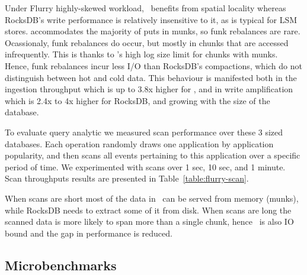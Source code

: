 Under Flurry highly-skewed workload, \sys\ benefits from spatial locality whereas RocksDB's write performance 
is relatively insensitive to it, as is typical for LSM stores. \sys\/ accommodates the majority of
puts in munks, so funk rebalances are rare. Ocassionaly, funk rebalances do occur, but mostly in 
chunks that are accessed infrequently. This is thanks to \sys\/'s high log size limit for chunks 
with munks. Hence, funk rebalances incur less I/O than RocksDB's compactions, 
which do not distinguish between hot and cold data. This behaviour is manifested both in the ingestion throughput which is up to 3.8x higher for \sys, and in write amplification which is 2.4x to 4x higher for RocksDB, and growing with the size of the database.


To evaluate query analytic we measured scan performance over these 3 sized databases. Each operation randomly draws one application by application popularity, and then scans all events pertaining to this application over a specific period of time. 
We experimented with scans over 1 sec, 10 sec, and 1 minute.
Scan throughputs results are presented in Table~\ref{table:flurry-scan}.

\begin{table}[htb]
\caption{{\sys\/ vs RocksDB different sized scans throughput over different sized 
Flurry databases.}}
\label{table:flurry-scan}
\end{table}

When scans are short most of the data in \sys\ can be served from memory (munks), while RocksDB needs to extract some of it from disk.
When scans are long the scanned data is more likely to span more than a single chunk, hence \sys\ is also IO bound and the gap in performance is reduced.


\subsection{Microbenchmarks}


